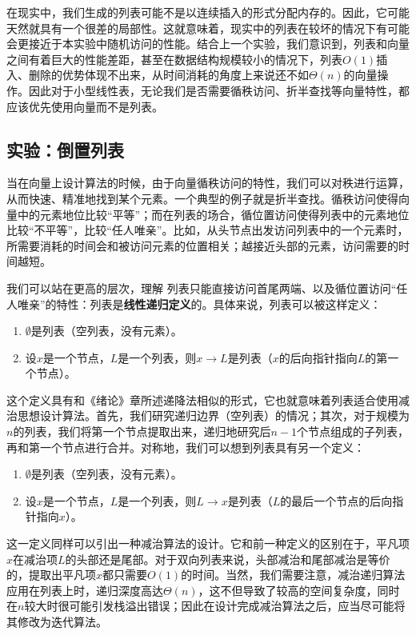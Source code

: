 在现实中，我们生成的列表可能不是以连续插入的形式分配内存的。因此，它可能天然就具有一个很差的局部性。这就意味着，现实中的列表在较坏的情况下有可能会更接近于本实验中随机访问的性能。结合上一个实验，我们意识到，列表和向量之间有着巨大的性能差距，甚至在数据结构规模较小的情况下，列表$O(1)$插入、删除的优势体现不出来，从时间消耗的角度上来说还不如$\Theta(n)$的向量操作。因此对于小型线性表，无论我们是否需要循秩访问、折半查找等向量特性，都应该优先使用向量而不是列表。

\subsection{实验：倒置列表}

当在向量上设计算法的时候，由于向量循秩访问的特性，我们可以对秩进行运算，从而快速、精准地找到某个元素。一个典型的例子就是折半查找。循秩访问使得向量中的元素地位比较“平等”；而在列表的场合，循位置访问使得列表中的元素地位比较“不平等”，比较“任人唯亲”。比如，从头节点出发访问列表中的一个元素时，所需要消耗的时间会和被访问元素的位置相关；越接近头部的元素，访问需要的时间越短。

我们可以站在更高的层次，理解
列表只能直接访问首尾两端、以及循位置访问“任人唯亲”的特性：列表是\textbf{线性递归定义}的。具体来说，列表可以被这样定义：
\begin{enumerate}
    \item $\emptyset$是列表（空列表，没有元素）。
    \item 设$x$是一个节点，$L$是一个列表，则$x\to L$是列表（$x$的后向指针指向$L$的第一个节点）。
\end{enumerate}

这个定义具有和《绪论》章所述递降法相似的形式，它也就意味着列表适合使用减治思想设计算法。首先，我们研究递归边界（空列表）的情况；其次，对于规模为$n$的列表，我们将第一个节点提取出来，递归地研究后$n-1$个节点组成的子列表，再和第一个节点进行合并。对称地，我们可以想到列表具有另一个定义：
\begin{enumerate}
    \item $\emptyset$是列表（空列表，没有元素）。
    \item 设$x$是一个节点，$L$是一个列表，则$L\to x$是列表（$L$的最后一个节点的后向指针指向$x$）。
\end{enumerate}

这一定义同样可以引出一种减治算法的设计。它和前一种定义的区别在于，平凡项$x$在减治项$L$的头部还是尾部。对于双向列表来说，头部减治和尾部减治是等价的，提取出平凡项$x$都只需要$O(1)$的时间。当然，我们需要注意，减治递归算法应用在列表上时，递归深度高达$\Theta(n)$，这不但导致了较高的空间复杂度，同时在$n$较大时很可能引发栈溢出错误；因此在设计完成减治算法之后，应当尽可能将其修改为迭代算法。

